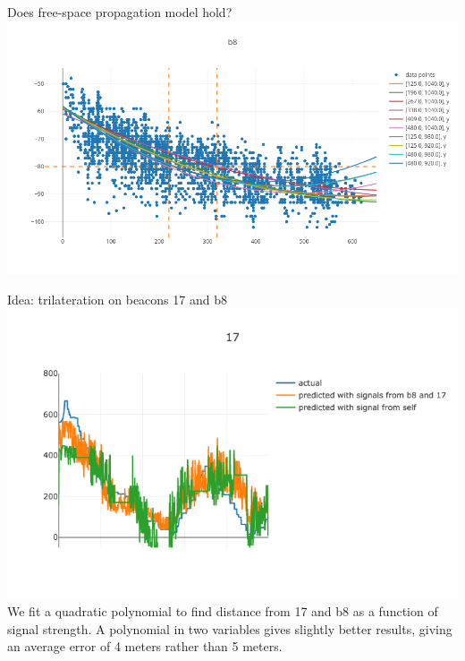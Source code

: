 \documentclass[landscape]{infslides}
\begin{document}
\begin{slide}{Does free-space propagation model hold?}
    \thispagestyle{nofooter}
\includegraphics[height=0.84\textheight,width=\textwidth]{images/different_directions.png}
\end{slide}

\begin{slide}{Idea: trilateration on beacons 17 and b8}
\includegraphics[width=\linewidth]{images/dist_f_rssi_17.png}
We fit a quadratic polynomial to find distance from 17 and b8 as a function of signal strength. A polynomial in two variables gives slightly better results, giving an average error of 4 meters rather than 5 meters.
\end{slide}
\end{document}
